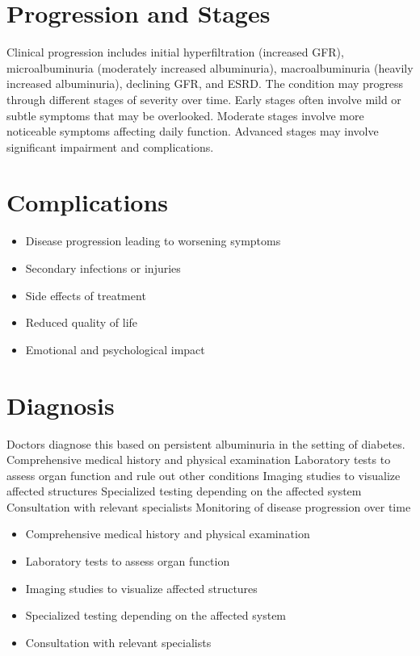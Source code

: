 \section{Progression and Stages}
Clinical progression includes initial hyperfiltration (increased GFR), microalbuminuria (moderately increased albuminuria), macroalbuminuria (heavily increased albuminuria), declining GFR, and ESRD. The condition may progress through different stages of severity over time. Early stages often involve mild or subtle symptoms that may be overlooked. Moderate stages involve more noticeable symptoms affecting daily function. Advanced stages may involve significant impairment and complications.
\section{Complications}
\begin{itemize}[noitemsep]
  \item Disease progression leading to worsening symptoms
  \item Secondary infections or injuries
  \item Side effects of treatment
  \item Reduced quality of life
  \item Emotional and psychological impact
\end{itemize}
\section{Diagnosis}
Doctors diagnose this based on persistent albuminuria in the setting of diabetes. Comprehensive medical history and physical examination Laboratory tests to assess organ function and rule out other conditions Imaging studies to visualize affected structures Specialized testing depending on the affected system Consultation with relevant specialists Monitoring of disease progression over time

\begin{itemize}[noitemsep]
  \item Comprehensive medical history and physical examination
  \item Laboratory tests to assess organ function
  \item Imaging studies to visualize affected structures
  \item Specialized testing depending on the affected system
  \item Consultation with relevant specialists
\end{itemize}
